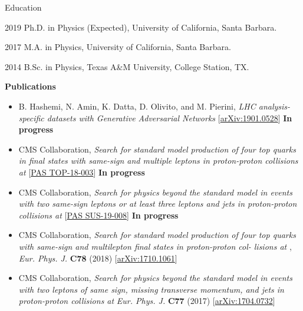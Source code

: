 \begin{vitae}

\begin{vitaesection}{Education}
\vspace{-0.1cm}
\item [2019] Ph.D. in Physics (Expected), University of California, Santa Barbara.
\item [2017] M.A. in Physics, University of California, Santa Barbara.
\item [2014] B.Sc. in Physics, Texas A\&M University, College Station, TX.
\end{vitaesection}

\textbf{Publications}



    \begin{itemize}
        \item B. Hashemi, N. Amin, K. Datta, D. Olivito, and M. Pierini, \textit{LHC analysis-specific datasets with Generative Adversarial Networks} [\href{https://arxiv.org/abs/1901.05282}{arXiv:1901.0528}] \textbf{In progress}
        \item CMS Collaboration, \textit{Search for standard model production of four top quarks in final states with same-sign and multiple leptons in proton-proton collisions at \sthirteen} 
            [\href{http://inspirehep.net/record/1726177}{PAS TOP-18-003}] \textbf{In progress}
        \item CMS Collaboration, \textit{Search for physics beyond the standard model in events with two same-sign leptons or at least three leptons and jets in proton-proton collisions at \sthirteen} 
            [\href{http://inspirehep.net/record/1726691}{PAS SUS-19-008}] \textbf{In progress}
        \item CMS Collaboration, \textit{Search for standard model production of four top quarks with same-sign and multilepton final states in proton-proton col- lisions at \sthirteen},
            \textit{Eur. Phys. J.} \textbf{C78} (2018) 
            [\href{https://arxiv.org/abs/1710.1061}{arXiv:1710.1061}]
        \item CMS Collaboration, \textit{Search for physics beyond the standard model in events with two leptons of same sign, missing transverse momentum, and jets in proton-proton collisions at \sthirteen}
            \textit{Eur. Phys. J.} \textbf{C77} (2017) 
            [\href{https://arxiv.org/abs/1704.0732}{arXiv:1704.0732}]
    \end{itemize}

\end{vitae}
